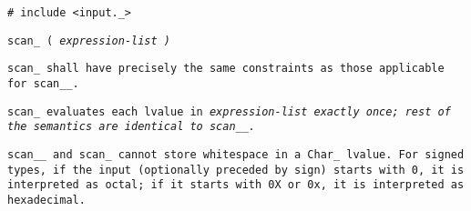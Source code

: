 
\tt{# include <input._>}

\tt{scan_ (} \it{expression-list} \tt{)}


\tt{scan_} shall have precisely the same
constraints as those applicable for \tt{scan__}.


\tt{scan_} evaluates each lvalue in \it{expression-list} exactly once;
rest of the semantics are identical to \tt{scan__}.

\note \tt{scan__} and \tt{scan_} cannot store whitespace in a \tt{Char_} lvalue.
For signed types, if the input (optionally preceded by sign)
starts with \tt{0}, it is interpreted as octal; if it starts
with \tt{0X} or \tt{0x}, it is interpreted as hexadecimal.
